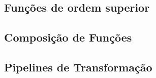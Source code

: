 \documentclass[date,twocolumn,a4paper]{ppgem}
\begin{document}
    \subsection{Funções de ordem superior}
    \subsection{Composição de Funções}
    \subsection{Pipelines de Transformação}





\end{document}
